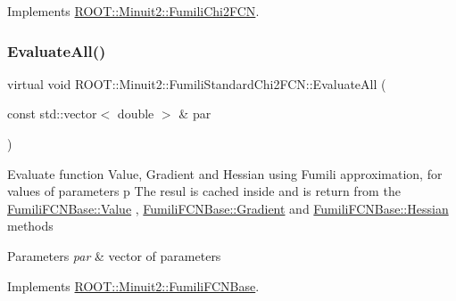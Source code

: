 Implements \mbox{\hyperlink{classROOT_1_1Minuit2_1_1FumiliChi2FCN_a25cc8dcc2eff831b3c0a94bf5413c2cd}{R\+O\+O\+T\+::\+Minuit2\+::\+Fumili\+Chi2\+F\+CN}}.

\mbox{\label{classROOT_1_1Minuit2_1_1FumiliStandardChi2FCN_ace15dd1aad435e460c523bc37bff12a8}} 
\subsubsection{\texorpdfstring{EvaluateAll()}{EvaluateAll()}\hspace{0.1cm}{\footnotesize\ttfamily [1/2]}}
{\footnotesize\ttfamily virtual void R\+O\+O\+T\+::\+Minuit2\+::\+Fumili\+Standard\+Chi2\+F\+C\+N\+::\+Evaluate\+All (\begin{DoxyParamCaption}\item[{const std\+::vector$<$ double $>$ \&}]{par }\end{DoxyParamCaption})\hspace{0.3cm}{\ttfamily [virtual]}}

Evaluate function Value, Gradient and Hessian using Fumili approximation, for values of parameters p The resul is cached inside and is return from the \mbox{\hyperlink{classROOT_1_1Minuit2_1_1FumiliFCNBase_a221dacee0ccde747a271a0cecd759f98}{Fumili\+F\+C\+N\+Base\+::\+Value}} , \mbox{\hyperlink{classROOT_1_1Minuit2_1_1FumiliFCNBase_ad226939ea2e83f754b5a6afc30876d3e}{Fumili\+F\+C\+N\+Base\+::\+Gradient}} and \mbox{\hyperlink{classROOT_1_1Minuit2_1_1FumiliFCNBase_ade134d8c6613393e942ef98d445db376}{Fumili\+F\+C\+N\+Base\+::\+Hessian}} methods


\begin{DoxyParams}{Parameters}
{\em par} & vector of parameters \\
\hline
\end{DoxyParams}


Implements \mbox{\hyperlink{classROOT_1_1Minuit2_1_1FumiliFCNBase_a0741bb4a7405cc33ab60583472a189cb}{R\+O\+O\+T\+::\+Minuit2\+::\+Fumili\+F\+C\+N\+Base}}.

\mbox{\label{classROOT_1_1Minuit2_1_1FumiliStandardChi2FCN_a76f42b6e5d2a92961a9fd8feca38b582}} 
